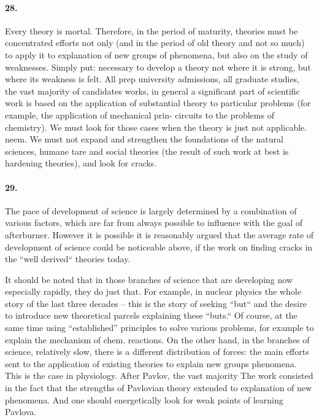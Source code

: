 \documentclass[11pt,a4paper]{article}
\begin{document}
\paragraph{28.}
Every theory is mortal. Therefore, in the period of maturity, theories must be
concentrated efforts not only (and in the period of old theory and not so
much) to apply it to explanation of new groups of phenomena, but also on the
study of weaknesses. Simply put: necessary to develop a theory not where it is
strong, but where its weakness is felt. All prep university admissions, all
graduate studies, the vast majority of candidates works, in general a
significant part of scientific work is based on the application of substantial
theory to particular problems (for example, the application of mechanical
prin- circuits to the problems of chemistry). We must look for those cases
when the theory is just not applicable.  neem. We must not expand and
strengthen the foundations of the natural sciences, humane tare and social
theories (the result of such work at best is hardening theories), and look for
cracks.

\paragraph{29.}
The pace of development of science is largely determined by a combination of
various factors, which are far from always possible to influence with the goal
of afterburner. However it is possible it is reasonably argued that the
average rate of development of science could be noticeable above, if the work
on finding cracks in the “well derived“ theories today.

It should be noted that in those branches of science that are developing now
especially rapidly, they do just that. For example, in nuclear physics the
whole story of the last three decades -- this is the story of seeking “but“
and the desire to introduce new theoretical parcels explaining these “buts.“
Of course, at the same time using “established” principles to solve various
problems, for example to explain the mechanism of chem. reactions. On the
other hand, in the branches of science, relatively slow, there is a different
distribution of forces: the main efforts sent to the application of existing
theories to explain new groups phenomena. This is the case in physiology.
After Pavlov, the vast majority The work consisted in the fact that the
strengths of Pavlovian theory extended to explanation of new phenomena. And
one should energetically look for weak points of learning Pavlova.
\end{document}
